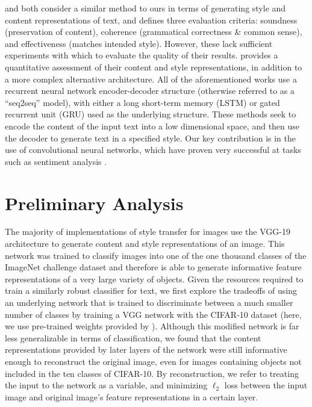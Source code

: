 \documentclass{vldb}
\begin{document}
\cite{Edirisooriya} and \cite{Kabbara16} both consider a similar method to ours in terms of generating style and content representations of text, and \cite{Kabbara16} defines three evaluation criteria: soundness (preservation of content), coherence (grammatical correctness \& common sense), and effectiveness (matches intended style). However, these lack sufficient experiments with which to evaluate the quality of their results. \cite{Fu17} provides a quantitative assessment of their content and style representations, in addition to a more complex alternative architecture. All of the aforementioned works use a recurrent neural network encoder-decoder structure (otherwise referred to as a ``seq2seq'' model), with either a long short-term memory (LSTM) or gated recurrent unit (GRU) used as the underlying structure. These methods seek to encode the content of the input text into a low dimensional space, and then use the decoder to generate text in a specified style. Our key contribution is in the use of convolutional neural networks, which have proven very successful at tasks such as sentiment analysis \cite{Kim14f}.

\section{Preliminary Analysis}
The majority of implementations of style transfer for images use the VGG-19 \cite{VGG19} architecture to generate content and style representations of an image. This network was trained to classify images into one of the one thousand classes of the ImageNet challenge dataset \cite{ILSVRC15} and therefore is able to generate informative feature representations of a very large variety of objects. Given the resources required to train a similarly robust classifier for text, we first explore the tradeoffs of using an underlying network that is trained to discriminate between a much smaller number of classes by training a VGG network with the CIFAR-10 dataset \cite{Krizhevsky09} (here, we use pre-trained weights provided by \cite{Liu15}). Although this modified network is far less generalizable in terms of classification, we found that the content representations provided by later layers of the network were still informative enough to reconstruct the original image, even for images containing objects not included in the ten classes of CIFAR-10. By reconstruction, we refer to treating the input to the network as a variable, and minimizing $\ell_2$ loss between the input image and original image's feature representations in a certain layer.
\end{document}

